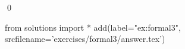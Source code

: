 
\begin{ex} 
  \label{ex:formal3}
  
  \qed
\end{ex} 
\begin{python0}
from solutions import *
add(label="ex:formal3",
    srcfilename='exercises/formal3/answer.tex') 
\end{python0}
